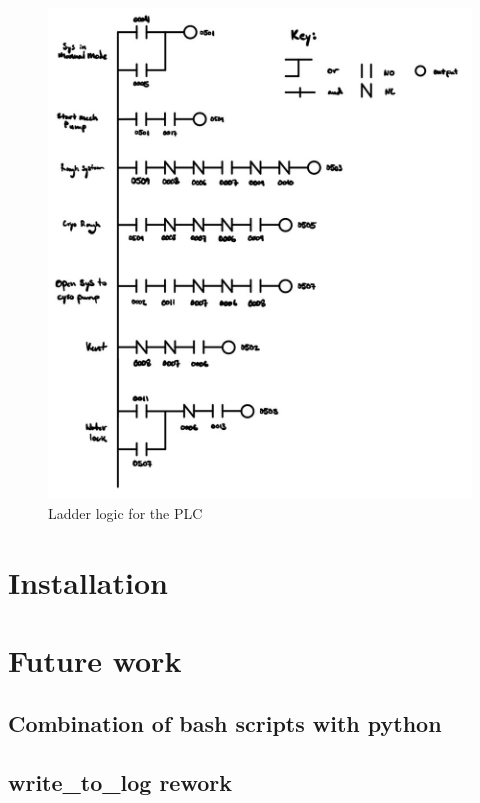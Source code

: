 \documentclass{article}
\begin{document}
\begin{center}
    \begin{figure}[h!]
      \includegraphics[scale=0.4]{IMG_0434.jpg}
      \caption{Ladder logic for the PLC}
      \label{fig:ladder}
    \end{figure}
\end{center}



\section{Installation}

\section{Future work}
\label{section:future}

\subsection{Combination of bash scripts with python}
\label{section:picombo}

\subsection{write\_to\_log rework}
\end{document}
